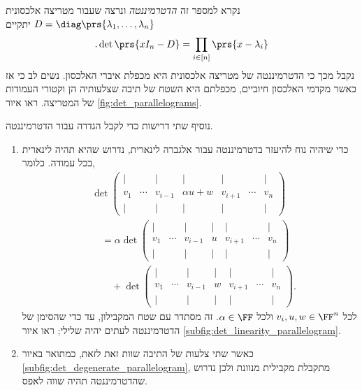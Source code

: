 \documentclass[a4paper,10pt,twoside,openany]{book}
\begin{document}
נקרא למספר זה
\emph{הדטרמיננטה}
ונרצה שעבור מטריצה אלכסונית
$D = \diag\prs{\lambda_1, \ldots, \lambda_n}$
יתקיים
\[ \text{.} \det\prs{x I_n - D} = \prod_{i \in [n]} \prs{x - \lambda_i}\]
נקבל מכך כי הדטרמיננטה של מטריצה אלכסונית היא מכפלת איברי האלכסון.
 נשים לב כי אז כאשר מקדמי האלכסון חיוביים, מכפלתם היא השטח של תיבה שצלעותיה הן וקטורי העמודות של המטריצה. ראו איור
 \ref{fig:det_parallelograms}.

נוסיף שתי דרישות כדי לקבל הגדרה עבור הדטרמיננטה.
\begin{enumerate}
\item כדי שיהיה נוח להיעזר בדטרמיננטה עבור אלגברה לינארית, נדרוש שהיא תהיה לינארית בכל עמודה.
כלומר,
\[
\begin{aligned}
&\det\begin{pmatrix}
\vert & & \vert & \vert & \vert & & \vert \\
v_1 & \cdots & v_{i-1} & \alpha u+w & v_{i+1} & \cdots & v_n \\
\vert & & \vert & \vert & \vert & & \vert
\end{pmatrix}
\\[1em]
&\quad=
\alpha\det\begin{pmatrix}
\vert & & \vert & \vert & \vert & & \vert \\
v_1 & \cdots & v_{i-1} & u & v_{i+1} & \cdots & v_n \\
\vert & & \vert & \vert & \vert & & \vert
\end{pmatrix}
\\[1em]
&\qquad+
\det\begin{pmatrix}
\vert & & \vert & \vert & \vert & & \vert \\
v_1 & \cdots & v_{i-1} & w & v_{i+1} & \cdots & v_n \\
\vert & & \vert & \vert & \vert & & \vert
\end{pmatrix}.
\end{aligned}
\]
לכל
$v_i, u, w \in \FF^n$
ולכל
$\alpha \in \FF$.
זה מסתדר עם שטח המקבילון, עד כדי שהסימן של הדטרמיננטה לעתים יהיה שלילי; ראו איור
\ref{subfig:det_linearity_parallelogram}.

\item
כאשר שתי צלעות של התיבה שוות זאת לזאת, כמתואר באיור
\ref{subfig:det_degenerate_parallelogram},
מתקבלת מקבילית מנוונת ולכן נדרוש שהדטרמיננטה תהיה שווה לאפס.
\end{enumerate}
\end{document}
